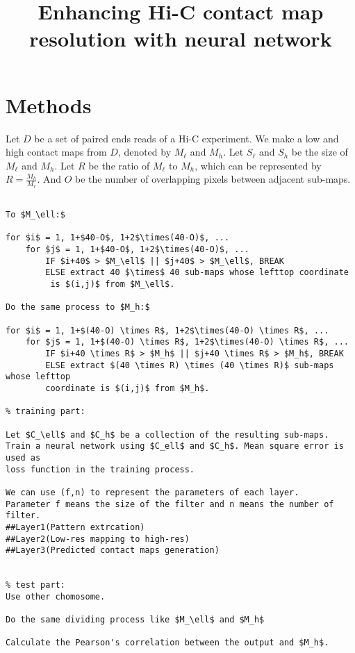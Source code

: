 \documentclass{article}
\begin{document}
\title{Enhancing Hi-C contact map resolution with neural network}
\author{}
\maketitle



\section{Methods}


Let $D$ be a set of paired ends reads of a Hi-C experiment. 
We make a low and high contact maps from $D$, denoted by $M_\ell$ and $M_h$. 
Let $S_\ell$ and $S_h$ be the size of $M_\ell$ and $M_h$. 
Let $R$ be the ratio of $M_\ell$ to $M_h$, which can be represented by
$R = \frac{M_h}{M_\ell}$. And $O$ be the number of overlapping pixels between adjacent sub-maps.

\begin{Verbatim}[commandchars=\\\{\},codes={\catcode`$=3\catcode`_=8}]
% Divide matrices $M_\ell$ and $M_h$ \

To $M_\ell:$

for $i$ = 1, 1+$40-O$, 1+2$\times(40-O)$, ...
    for $j$ = 1, 1+$40-O$, 1+2$\times(40-O)$, ...
        IF $i+40$ > $M_\ell$ || $j+40$ > $M_\ell$, BREAK 
        ELSE extract 40 $\times$ 40 sub-maps whose lefttop coordinate
         is $(i,j)$ from $M_\ell$.

Do the same process to $M_h:$

for $i$ = 1, 1+$(40-O) \times R$, 1+2$\times(40-O) \times R$, ...
    for $j$ = 1, 1+$(40-O) \times R$, 1+2$\times(40-O) \times R$, ...
        IF $i+40 \times R$ > $M_h$ || $j+40 \times R$ > $M_h$, BREAK 
        ELSE extract $(40 \times R) \times (40 \times R)$ sub-maps whose lefttop 
        coordinate is $(i,j)$ from $M_h$.

% training part: 

Let $C_\ell$ and $C_h$ be a collection of the resulting sub-maps. 
Train a neural network using $C_ell$ and $C_h$. Mean square error is used as 
loss function in the training process. 

We can use (f,n) to represent the parameters of each layer. 
Parameter f means the size of the filter and n means the number of filter. 
##Layer1(Pattern extrcation)
##Layer2(Low-res mapping to high-res)
##Layer3(Predicted contact maps generation)


% test part: 
Use other chomosome. 

Do the same dividing process like $M_\ell$ and $M_h$

Calculate the Pearson's correlation between the output and $M_h$.

\end{Verbatim}
\end{document}
